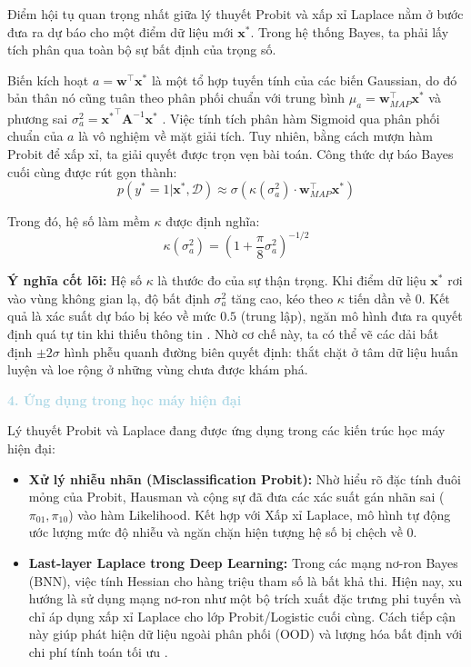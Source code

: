 Điểm hội tụ quan trọng nhất giữa lý thuyết Probit và xấp xỉ Laplace nằm ở bước đưa ra dự báo cho một điểm dữ liệu mới $\mathbf{x}^*$. Trong hệ thống Bayes, ta phải lấy tích phân qua toàn bộ sự bất định của trọng số.

Biến kích hoạt $a = \mathbf{w}^\top \mathbf{x}^*$ là một tổ hợp tuyến tính của các biến Gaussian, do đó bản thân nó cũng tuân theo phân phối chuẩn với trung bình $\mu_a = \mathbf{w}_{MAP}^\top \mathbf{x}^*$ và phương sai $\sigma_a^2 = {\mathbf{x}^*}^\top \mathbf{A}^{-1} \mathbf{x}^*$ \cite{bishop2006pattern}. Việc tính tích phân hàm Sigmoid qua phân phối chuẩn của $a$ là vô nghiệm về mặt giải tích. Tuy nhiên, bằng cách mượn hàm Probit để xấp xỉ, ta giải quyết được trọn vẹn bài toán. Công thức dự báo Bayes cuối cùng được rút gọn thành:
\begin{equation}
    p(y^*=1 | \mathbf{x}^*, \mathcal{D}) \approx \sigma\left(\kappa(\sigma_a^2) \cdot \mathbf{w}_{MAP}^\top \mathbf{x}^*\right)
\end{equation}

Trong đó, hệ số làm mềm $\kappa$ được định nghĩa:
\begin{equation}
    \kappa(\sigma_a^2) = \left(1 + \frac{\pi}{8} \sigma_a^2\right)^{-1/2}
\end{equation}

\textbf{Ý nghĩa cốt lõi:} Hệ số $\kappa$ là thước đo của sự thận trọng. Khi điểm dữ liệu $\mathbf{x}^*$ rơi vào vùng không gian lạ, độ bất định $\sigma_a^2$ tăng cao, kéo theo $\kappa$ tiến dần về $0$. Kết quả là xác suất dự báo bị kéo về mức $0.5$ (trung lập), ngăn mô hình đưa ra quyết định quá tự tin khi thiếu thông tin \cite{bishop2006pattern}. Nhờ cơ chế này, ta có thể vẽ các dải bất định $\pm 2\sigma$ hình phễu quanh đường biên quyết định: thắt chặt ở tâm dữ liệu huấn luyện và loe rộng ở những vùng chưa được khám phá.

\vspace{0.5em}
\noindent\textcolor{lightblue}{\textbf{4. Ứng dụng trong học máy hiện đại}}
\vspace{0.5em}

Lý thuyết Probit và Laplace đang được ứng dụng trong các kiến trúc học máy hiện đại:
\begin{itemize}
    \item \textbf{Xử lý nhiễu nhãn (Misclassification Probit):} Nhờ hiểu rõ đặc tính đuôi mỏng của Probit, Hausman và cộng sự đã đưa các xác suất gán nhãn sai ($\pi_{01}, \pi_{10}$) vào hàm Likelihood. Kết hợp với Xấp xỉ Laplace, mô hình tự động ước lượng mức độ nhiễu và ngăn chặn hiện tượng hệ số bị chệch về $0$.
    \item \textbf{Last-layer Laplace trong Deep Learning:} Trong các mạng nơ-ron Bayes (BNN), việc tính Hessian cho hàng triệu tham số là bất khả thi. Hiện nay, xu hướng là sử dụng mạng nơ-ron như một bộ trích xuất đặc trưng phi tuyến và chỉ áp dụng xấp xỉ Laplace cho lớp Probit/Logistic cuối cùng. Cách tiếp cận này giúp phát hiện dữ liệu ngoài phân phối (OOD) và lượng hóa bất định với chi phí tính toán tối ưu \cite{fisher1925theory}.
\end{itemize}

